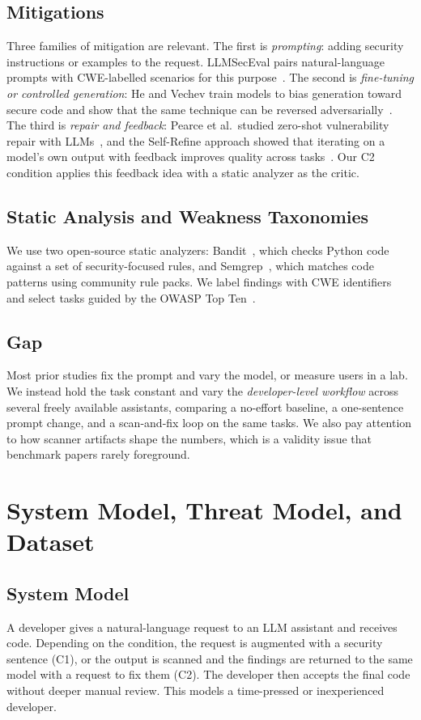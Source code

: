 \documentclass[conference]{IEEEtran}
\begin{document}
\subsection{Mitigations}
Three families of mitigation are relevant. The first is \emph{prompting}: adding security instructions or examples to the request. LLMSecEval pairs natural-language prompts with CWE-labelled scenarios for this purpose~\cite{tony2023llmseceval}. The second is \emph{fine-tuning or controlled generation}: He and Vechev train models to bias generation toward secure code and show that the same technique can be reversed adversarially~\cite{he2023hardening}. The third is \emph{repair and feedback}: Pearce et al.\ studied zero-shot vulnerability repair with LLMs~\cite{pearce2023repair}, and the Self-Refine approach showed that iterating on a model's own output with feedback improves quality across tasks~\cite{madaan2023selfrefine}. Our C2 condition applies this feedback idea with a static analyzer as the critic.

\subsection{Static Analysis and Weakness Taxonomies}
We use two open-source static analyzers: Bandit~\cite{bandit}, which checks Python code against a set of security-focused rules, and Semgrep~\cite{semgrep}, which matches code patterns using community rule packs. We label findings with CWE identifiers~\cite{cwe} and select tasks guided by the OWASP Top Ten~\cite{owasp}.

\subsection{Gap}
Most prior studies fix the prompt and vary the model, or measure users in a lab. We instead hold the task constant and vary the \emph{developer-level workflow} across several freely available assistants, comparing a no-effort baseline, a one-sentence prompt change, and a scan-and-fix loop on the same tasks. We also pay attention to how scanner artifacts shape the numbers, which is a validity issue that benchmark papers rarely foreground.

\section{System Model, Threat Model, and Dataset}
\subsection{System Model}
A developer gives a natural-language request to an LLM assistant and receives code. Depending on the condition, the request is augmented with a security sentence (C1), or the output is scanned and the findings are returned to the same model with a request to fix them (C2). The developer then accepts the final code without deeper manual review. This models a time-pressed or inexperienced developer.
\end{document}
